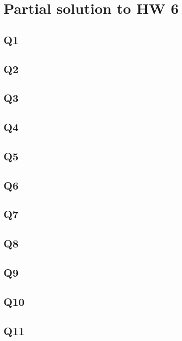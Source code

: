 \documentclass[12pt]{article}
\begin{document}
\section*{Partial solution to HW 6}
\subsection*{Q1}
\subsection*{Q2}
\subsection*{Q3}
\subsection*{Q4}
\subsection*{Q5}
\subsection*{Q6}
\subsection*{Q7}
\subsection*{Q8}
\subsection*{Q9}
\subsection*{Q10}
\subsection*{Q11}
\end{document}
